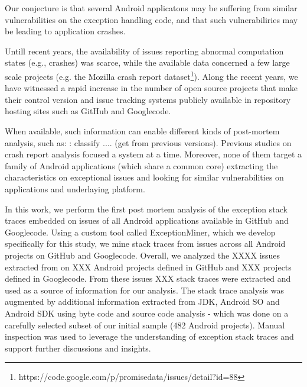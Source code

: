 \documentclass[conference]{IEEEtran}
\begin{document}
Our conjecture is that several Android applicatons may be suffering from similar vulnerabilities on the exception
handling code, and that such vulnerabiliries may be leading to application crashes.

Untill recent years, the availability of issues reporting abnormal
computation states (e.g., crashes) was scarce, while the
available data concerned a few large scale projects (e.g. the Mozilla
crash report dataset\footnote{https://code.google.com/p/promisedata/issues/detail?id=88}).
Along the recent years, we have witnessed a rapid increase in the number of open
source projects that make their control version and issue tracking systems
publicly available in repository hosting sites such as GitHub and Googlecode.



When available, such information can enable different kinds of post-mortem analysis, such as:
: classify .... (get from previous versions). Previous studies on crash report analysis focused a system 
at a time. Moreover, none of them target 
a family of Android applications (which share a common core) extracting the characteristics on exceptional issues 
and looking for similar vulnerabilities on applications and underlaying platform.

In this work, we perform the first post mortem analysis of the exception stack traces embedded on issues
of all Android applications available in GitHub and Googlecode. Using a custom tool called ExceptionMiner,
 which we develop specifically for this study, we mine stack traces from issues across all Android projects on
GitHub and Googlecode. Overall, we analyzed the XXXX issues extracted from on XXX Android projects defined in
GitHub and XXX projects defined in Googlecode. From these issues  XXX stack traces were extracted and used as
 a source of information for our analysis. The stack trace analysis was augmented by additional information
extracted from JDK, Android SO and Android SDK using byte code and source code analysis - which was done 
on a carefully selected subset of our initial sample (482 Android projects). Manual inspection was
used to leverage the understanding of exception stack traces and support further discussions and insights.
\end{document}
